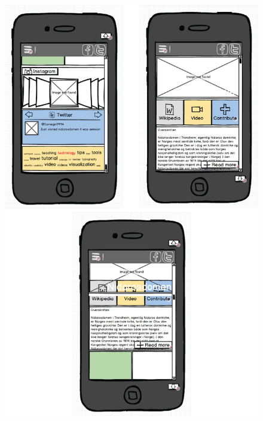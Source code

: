 \documentclass[12pt,a4paper,titlepage]{article}
\begin{document}
\begin{appendices}
\begin{figure}[!h]
\centering
\includegraphics[width=0.9 \textwidth] {res/mockup1.png}
\end{figure}


\end{appendices}
\end{document}
